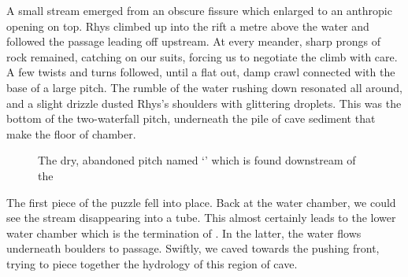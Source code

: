     A small stream emerged from an obscure fissure which enlarged to an anthropic opening on top. Rhys climbed up into the rift a metre above the water and followed the passage leading off upstream. At every meander, sharp prongs of rock remained, catching on our suits, forcing us to negotiate the climb with care. A few twists and turns followed, until a flat out, damp crawl connected with the base of a large pitch. The rumble of the water rushing down resonated all around, and a slight drizzle dusted Rhys's shoulders with glittering droplets. This was the bottom of the two-waterfall pitch, underneath the pile of  cave sediment that make the floor of  chamber.

    \begin{figure}[t!]
        \checkoddpage \ifoddpage \forcerectofloat \else \forceversofloat \fi
        \centering
        
        \caption{The dry, abandoned pitch named `\protect{}' which is found downstream of the \protect{} }
        \label{water chamber below helm's deep}
    \end{figure}



	The first piece of the puzzle fell into place. Back at the water chamber, we could see the stream disappearing into a tube. This almost certainly leads to the lower water chamber which is the termination of . In the latter, the water flows underneath boulders to  passage. Swiftly, we caved towards the pushing front, trying to piece together the hydrology of this region of cave.



